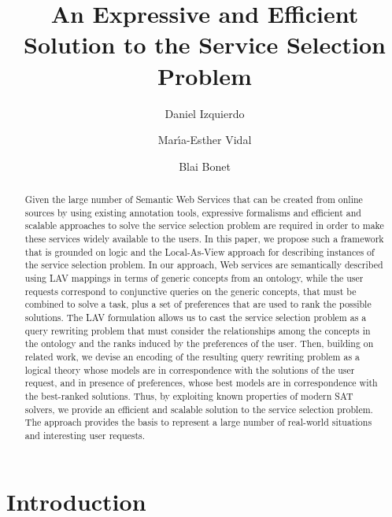 \documentclass{llncs}
\begin{document}
\allowdisplaybreaks
\title{An Expressive and Efficient Solution to the Service Selection Problem}
\author{Daniel Izquierdo \and Mar\'{\i}a-Esther Vidal \and Blai Bonet}
\maketitle

\begin{abstract}
Given the large number of Semantic Web Services that can be created from
online sources by using existing annotation tools, expressive formalisms and
efficient and scalable approaches to solve the service selection problem are
required in order to make these services widely available to the users.
In this paper, we propose such a framework that is grounded on logic and
the Local-As-View approach for describing instances of the service selection problem.
In our approach, Web services are semantically described using LAV mappings
in terms of generic concepts from an ontology, while the user requests correspond
to conjunctive queries on the generic concepts, that must be combined to solve
a task, plus a set of preferences that are used to rank the possible solutions.
The LAV formulation allows us to cast the service selection problem as a
query rewriting problem that must consider the relationships among the concepts
in the ontology and the ranks induced by the preferences of the user.
Then, building on related work, we devise an encoding of the resulting
query rewriting problem as a logical theory whose models are in correspondence
with the solutions of the user request, and in presence of preferences, whose
best models are in correspondence with the best-ranked solutions.
Thus, by exploiting known properties of modern SAT solvers, we provide an
efficient and scalable solution to the service selection problem.
The approach provides the basis to represent a large number of real-world
situations and interesting user requests.
\end{abstract}                

\section{Introduction}
\end{document}
